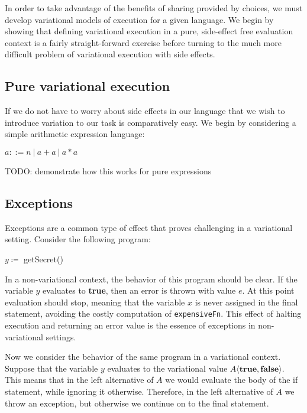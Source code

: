 \documentclass[letterpaper,10pt,onecolumn]{article}
\begin{document}
In order to take advantage of the benefits of sharing provided by choices, we must develop variational
models of execution for a given language. We begin by showing that defining variational execution in a pure,
side-effect free evaluation context is a fairly straight-forward exercise before turning to the much more
difficult problem of variational execution with side effects.

\subsection{Pure variational execution}

If we do not have to worry about side effects in our language that we wish to introduce variation to
our task is comparatively easy. We begin by considering a simple arithmetic expression language:

$a ::= n\ |\ a + a\ |\ a * a$

TODO: demonstrate how this works for pure expressions


\subsection{Exceptions}

Exceptions are a common type of effect that proves challenging in a variational setting.
Consider the following program:

\begin{algorithmic}
\STATE $y \coloneqq$ getSecret()
\ENDIF
{}
\end{algorithmic}

In a non-variational context, the behavior of this program should be clear.
If the variable $y$ evaluates to \textbf{true}, then an error is thrown with value
$e$. At this point evaluation should stop, meaning that the variable $x$ is never
assigned in the final statement, avoiding the costly computation of \texttt{expensiveFn}. This effect of halting execution and
returning an error value is the essence of exceptions in non-variational settings.

Now we consider the behavior of the same program in a variational context.
Suppose that the variable $y$ evaluates to the variational value
$A \langle \textbf{true}, \textbf{false} \rangle$. This means that in the left alternative of $A$ we
would evaluate the body of the if statement, while ignoring it otherwise. Therefore,
in the left alternative of $A$ we throw an exception, but otherwise we continue on to the
final statement.
\end{document}
